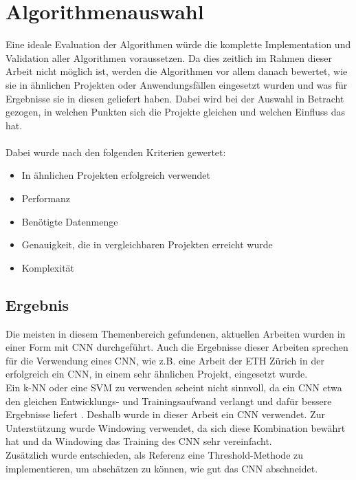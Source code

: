 \section{Algorithmenauswahl}

Eine ideale Evaluation der Algorithmen würde die komplette Implementation und Validation aller Algorithmen voraussetzen. Da dies zeitlich im Rahmen dieser Arbeit nicht möglich ist, werden die Algorithmen vor allem danach bewertet, wie sie in ähnlichen Projekten oder Anwendungsfällen eingesetzt wurden und was für Ergebnisse sie in diesen geliefert haben. Dabei wird bei der Auswahl in Betracht gezogen, in welchen Punkten sich die Projekte gleichen und welchen Einfluss das hat.\\
\\
Dabei wurde nach den folgenden Kriterien gewertet:
\begin{itemize}
	\item In ähnlichen Projekten erfolgreich verwendet
	\item Performanz
	\item Benötigte Datenmenge
	\item Genauigkeit, die in vergleichbaren Projekten erreicht wurde
	\item Komplexität
\end{itemize}

\subsection{Ergebnis}

Die meisten in diesem Themenbereich gefundenen, aktuellen Arbeiten wurden in einer Form mit \gls{CNN} durchgeführt. Auch die Ergebnisse dieser Arbeiten sprechen für die Verwendung eines \gls{CNN}, wie z.B. eine Arbeit der ETH Zürich \parencite{gomez2018thermal} in der erfolgreich ein \gls{CNN}, in einem sehr ähnlichen Projekt, eingesetzt wurde. \\
Ein \gls{k-NN} oder eine \gls{SVM} zu verwenden scheint nicht sinnvoll, da ein \gls{CNN} etwa den gleichen Entwicklungs- und Trainingsaufwand verlangt und dafür bessere Ergebnisse liefert \parencite{comparison_algorithms}.
Deshalb wurde in dieser Arbeit ein \gls{CNN} verwendet. Zur Unterstützung wurde Windowing verwendet, da sich diese Kombination bewährt hat \parencite{gomez2018thermal} und da Windowing das Training des CNN sehr vereinfacht.\\
Zusätzlich wurde entschieden, als Referenz eine Threshold-Methode zu implementieren, um abschätzen zu können, wie gut das \gls{CNN} abschneidet.





